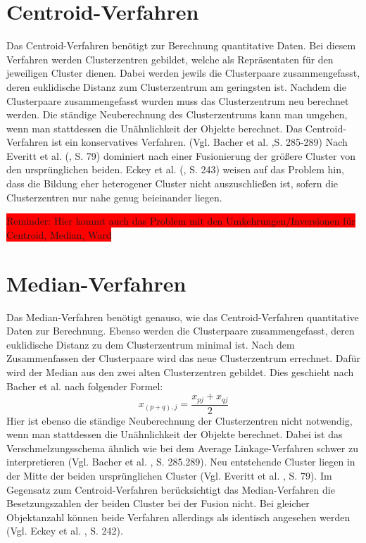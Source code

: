 \section{Centroid-Verfahren}
Das Centroid-Verfahren benötigt zur Berechnung quantitative Daten. Bei diesem Verfahren werden Clusterzentren gebildet, welche als Repräsentaten für den jeweiligen Cluster dienen. Dabei werden jewils die Clusterpaare zusammengefasst, deren euklidische Distanz zum Clusterzentrum am geringsten ist. Nachdem die Clusterpaare zusammengefasst wurden muss das Clusterzentrum neu berechnet werden. Die ständige Neuberechnung des Clusterzentrums kann man umgehen, wenn man stattdessen die Unähnlichkeit der Objekte berechnet. Das Centroid-Verfahren ist ein konservatives Verfahren. (Vgl. Bacher et al. \cite{Bacher.2010},S. 285-289) Nach Everitt et al. (\cite{Everitt.2011}, S. 79) dominiert nach einer Fusionierung der größere Cluster von den ursprünglichen beiden.
Eckey et al. (\cite{Eckey.2002}, S. 243) weisen auf das Problem hin, dass die Bildung eher heterogener Cluster nicht auszuschließen ist, sofern die Clusterzentren nur nahe genug beieinander liegen.

\colorbox{red}{Reminder: Hier kommt auch das Problem mit den Umkehrungen/Inversionen für Centroid, Median, Ward}

\section{Median-Verfahren}
Das Median-Verfahren benötigt genauso, wie das Centroid-Verfahren quantitative Daten zur Berechnung. Ebenso werden die Clusterpaare zusammengefasst, deren euklidische Distanz zu dem Clusterzentrum minimal ist. Nach dem Zusammenfassen der Clusterpaare wird das neue Clusterzentrum errechnet. Dafür wird der Median aus den zwei alten Clusterzentren gebildet. Dies geschieht nach Bacher et al. \cite{Bacher.2010} nach folgender Formel:
\begin{equation}
	x_{(p+q),j} = \frac{x_{pj} + x_{qj}}{2}
\end{equation}
Hier ist ebenso die ständige Neuberechnung der Clusterzentren nicht notwendig, wenn man stattdessen die Unähnlichkeit der Objekte berechnet. Dabei ist das Verschmelzungsschema ähnlich wie bei dem Average Linkage-Verfahren schwer zu interpretieren (Vgl. Bacher et al. \cite{Bacher.2010}, S. 285.289). Neu entstehende Cluster liegen in der Mitte der beiden ursprünglichen Cluster (Vgl. Everitt et al. \cite{Everitt.2011}, S. 79).
Im Gegensatz zum Centroid-Verfahren berücksichtigt das Median-Verfahren die Besetzungszahlen der beiden Cluster bei der Fusion nicht. Bei gleicher Objektanzahl können beide Verfahren allerdings als identisch angesehen werden (Vgl. Eckey et al. \cite{Eckey.2002}, S. 242).

